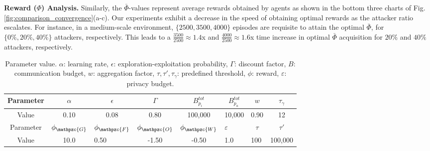 \textbf{Reward ($\Phi$) Analysis.} Similarly, the $\bar{\Phi}$-values represent average rewards obtained by agents as shown in the bottom three charts of Fig. \ref{fig:comparison_convergence}(a-c). Our experiments exhibit a decrease in the speed of obtaining optimal rewards as the attacker ratio escalates. For instance, in a medium-scale environment, $\{2500, 3500, 4000\}$ episodes are requisite to attain the optimal $\bar{\Phi}$, for $\{0\%, 20\%, 40\%\}$ attackers, respectively. This leads to a $\frac{3500}{2500} \approx 1.4$x and $\frac{4000}{2500} \approx 1.6$x time increase in optimal $\bar{\Phi}$ acquisition for $20\%$ and $40\%$ attackers, respectively.
\setlength{\textfloatsep}{8pt}%
\begin{table}[!ht]
\centering
\caption{\small Parameter value. $\alpha$: learning rate, $\epsilon$: exploration-exploitation probability, $\Gamma$: discount factor, $B$: communication budget, $w$: aggregation factor, $\tau, \tau', \tau_{\gamma}$: predefined threshold, $\phi$: reward, $\varepsilon$: privacy budget.}
\label{tab:parameter}
\begin{adjustbox}{max width=\linewidth}
\begin{tabular}{c|c|c|c|c|c|c|c}
\toprule
Parameter &
$\alpha$                                                      & $\epsilon$                                                    & $\Gamma$                                                      & \multicolumn{1}{c|}{$B^{tot}_{p_i}$}           & $B^{tot}_{p_a}$                          & $w$                                          & $\tau_{\gamma}$   \\ 
\midrule
Value &
0.10                                                                           & 0.08                                                                           & 0.80                                                                           & 100,000                           & 10,000                                              & 0.90                                           & 12                       \\
\midrule
\multicolumn{1}{c|}{Parameter} &
\multicolumn{1}{c|}{$\phi_{\mathpzc{G}}$} & \multicolumn{1}{c|}{$\phi_{\mathpzc{F}}$} & \multicolumn{1}{c|}{$\phi_{\mathpzc{O}}$} & $\phi_{\mathpzc{W}}$ & \multicolumn{1}{l|}{$\varepsilon$} & \multicolumn{1}{c|}{$\tau$} & $\tau'$  \\ 
\midrule
\multicolumn{1}{c|}{Value}  & 
\multicolumn{1}{c|}{10.0}                                                      & \multicolumn{1}{l|}{0.50}                                                      & \multicolumn{1}{c|}{-1.50}                                                     & -0.50                                                     & \multicolumn{1}{l|}{1.0}                            & \multicolumn{1}{l|}{100}                      & 100,000   \\
\bottomrule
\end{tabular}
\end{adjustbox}
\end{table}

